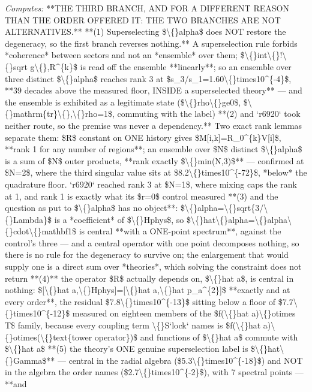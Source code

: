 \begin{description}
\emph{Computes:} **THE THIRD BRANCH, AND FOR A DIFFERENT REASON THAN THE ORDER OFFERED IT: THE TWO BRANCHES ARE NOT ALTERNATIVES.**  **(1) Superselecting \$\textbackslash\{\}alpha\$ does NOT restore the degeneracy, so the first branch reverses nothing.** A superselection rule forbids *coherence* between sectors and not an *ensemble* over them; \$\textbackslash\{\}int\textbackslash\{\}!\textbackslash\{\}sqrt g\textbackslash\{\},R\textasciicircum{}\{k\}\$ is read off the ensemble **linearly**; so an ensemble over three distinct \$\textbackslash\{\}alpha\$ reaches rank 3 at \$s\_3/s\_1=1.60\textbackslash\{\}times10\textasciicircum{}\{-4\}\$, **39 decades above the measured floor, INSIDE a superselected theory** --- and the ensemble is exhibited as a legitimate state (\$\textbackslash\{\}rho\textbackslash\{\}ge0\$, \$\textbackslash\{\}mathrm\{tr\}\textbackslash\{\},\textbackslash\{\}rho=1\$, commuting with the label)  **(2) and `r6920` took neither route, so the premise was never a dependency.** Two exact rank lemmas separate them: \$R\$ constant on ONE history gives \$M[i,k]=R\_0\textasciicircum{}\{k\}V[i]\$, **rank 1 for any number of regions**; an ensemble over \$N\$ distinct \$\textbackslash\{\}alpha\$ is a sum of \$N\$ outer products, **rank exactly \$\textbackslash\{\}min(N,3)\$** --- confirmed at \$N=2\$, where the third singular value sits at \$8.2\textbackslash\{\}times10\textasciicircum{}\{-72\}\$, *below* the quadrature floor.  `r6920` reached rank 3 at \$N=1\$, where mixing caps the rank at 1, and rank 1 is exactly what its \$r=0\$ control measured  **(3) and the question as put to \$\textbackslash\{\}alpha\$ has no object**: \$\textbackslash\{\}alpha=\textbackslash\{\}sqrt\{3/\textbackslash\{\}Lambda\}\$ is a *coefficient* of \$\textbackslash\{\}Hphys\$, so \$\textbackslash\{\}hat\textbackslash\{\}alpha=\textbackslash\{\}alpha\textbackslash\{\}cdot\textbackslash\{\}mathbf1\$ is central **with a ONE-point spectrum**, against the control's three --- and a central operator with one point decomposes nothing, so there is no rule for the degeneracy to survive on; the enlargement that would supply one is a direct sum over *theories*, which solving the constraint does not return  **(4)** the operator \$R\$ actually depends on, \$\textbackslash\{\}hat a\$, is central in nothing: \$[\textbackslash\{\}hat a,\textbackslash\{\}Hphys]=[\textbackslash\{\}hat a,\textbackslash\{\}hat p\_a\textasciicircum{}\{2\}]\$ **exactly and at every order**, the residual \$7.8\textbackslash\{\}times10\textasciicircum{}\{-13\}\$ sitting below a floor of \$7.7\textbackslash\{\}times10\textasciicircum{}\{-12\}\$ measured on eighteen members of the \$f(\textbackslash\{\}hat a)\textbackslash\{\}otimes T\$ family, because every coupling term \textbackslash\{\}S`lock` names is \$f(\textbackslash\{\}hat a)\textbackslash\{\}otimes(\textbackslash\{\}text\{tower operator\})\$ and functions of \$\textbackslash\{\}hat a\$ commute with \$\textbackslash\{\}hat a\$  **(5) the theory's ONE genuine superselection label is \$\textbackslash\{\}hat\textbackslash\{\}Gamma\$** --- central in the radial algebra (\$5.3\textbackslash\{\}times10\textasciicircum{}\{-18\}\$) and NOT in the algebra the order names (\$2.7\textbackslash\{\}times10\textasciicircum{}\{-2\}\$), with 7 spectral points --- **and 
\end{description}

